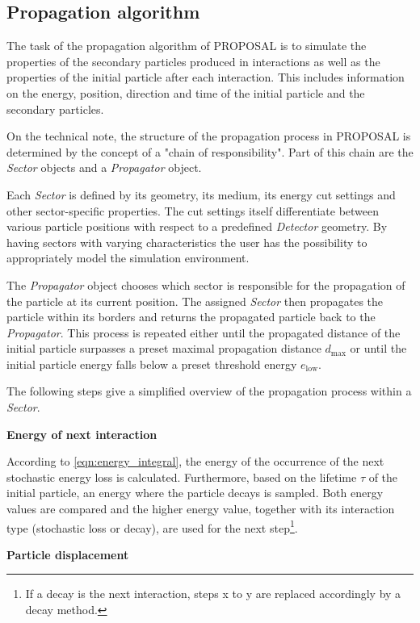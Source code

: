 \subsection{Propagation algorithm}
\label{sec:algorithm}

The task of the propagation algorithm of PROPOSAL is to simulate the properties of the secondary particles produced in interactions as well as the properties of the initial particle after each interaction.
This includes information on the energy, position, direction and time of the initial particle and the secondary particles.

On the technical note, the structure of the propagation process in PROPOSAL is determined by the concept of a "chain of responsibility".
Part of this chain are the \emph{Sector} objects and a \emph{Propagator} object.

Each \emph{Sector} is defined by its geometry, its medium, its energy cut settings and other sector-specific properties.
The cut settings itself differentiate between various particle positions with respect to a predefined \emph{Detector} geometry.
By having sectors with varying characteristics the user has the possibility to appropriately model the simulation environment.

The \emph{Propagator} object chooses which sector is responsible for the propagation of the particle at its current position.
The assigned \emph{Sector} then propagates the particle within its borders and returns the propagated particle back to the \emph{Propagator}.
This process is repeated either until the propagated distance of the initial particle surpasses a preset maximal propagation distance $d_\text{max}$ or until the initial particle energy falls below a preset threshold energy $e_\text{low}$.

The following steps give a simplified overview of the propagation process within a \emph{Sector}.

\textbf{Energy of next interaction}

According to \ref{eqn:energy_integral}, the energy of the occurrence of the next stochastic energy loss is calculated.
Furthermore, based on the lifetime $\tau$ of the initial particle, an energy where the particle decays is sampled.
Both energy values are compared and the higher energy value, together with its interaction type (stochastic loss or decay), are used for the next step\footnote{If a decay is the next interaction, steps x to y are replaced accordingly by a decay method.}.

\textbf{Particle displacement}


